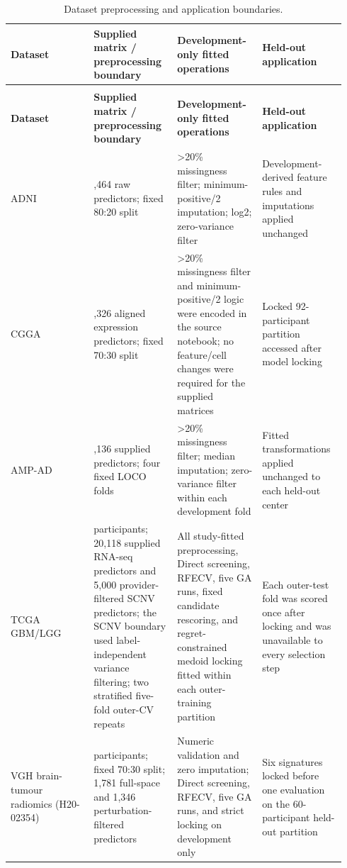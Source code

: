 {
\small
\renewcommand{\arraystretch}{1.08}
\setlength{\tabcolsep}{2.2pt}
\begin{longtable}{@{}>{\raggedright\arraybackslash}p{0.2350\linewidth}>{\centering\arraybackslash}p{0.2350\linewidth}>{\centering\arraybackslash}p{0.2350\linewidth}>{\raggedright\arraybackslash}p{0.2350\linewidth}@{}}
\caption{Dataset preprocessing and application boundaries.}\label{tab:supp26}\\
\toprule
\bfseries Dataset & \bfseries Supplied matrix / preprocessing boundary & \bfseries Development-only fitted operations & \bfseries Held-out application \\
\midrule
\endfirsthead
\multicolumn{4}{l}{\footnotesize\itshape \tablename~\thetable\ (continued)}\\
\toprule
\bfseries Dataset & \bfseries Supplied matrix / preprocessing boundary & \bfseries Development-only fitted operations & \bfseries Held-out application \\
\midrule
\endhead
\bottomrule
\endfoot
ADNI & 7,464 raw predictors; fixed 80:20 split & >20\% missingness filter; minimum-positive/2 imputation; log2; zero-variance filter & Development-derived feature rules and imputations applied unchanged \\
CGGA & 24,326 aligned expression predictors; fixed 70:30 split & >20\% missingness filter and minimum-positive/2 logic were encoded in the source notebook; no feature/cell changes were required for the supplied matrices & Locked 92-participant partition accessed after model locking \\
AMP-AD & 13,136 supplied predictors; four fixed LOCO folds & >20\% missingness filter; median imputation; zero-variance filter within each development fold & Fitted transformations applied unchanged to each held-out center \\
TCGA GBM/LGG & 491 participants; 20,118 supplied RNA-seq predictors and 5,000 provider-filtered SCNV predictors; the SCNV boundary used label-independent variance filtering; two stratified five-fold outer-CV repeats & All study-fitted preprocessing, Direct screening, RFECV, five GA runs, fixed candidate rescoring, and regret-constrained medoid locking fitted within each outer-training partition & Each outer-test fold was scored once after locking and was unavailable to every selection step \\
VGH brain-tumour radiomics (H20-02354) & 197 participants; fixed 70:30 split; 1,781 full-space and 1,346 perturbation-filtered predictors & Numeric validation and zero imputation; Direct screening, RFECV, five GA runs, and strict locking on development only & Six signatures locked before one evaluation on the 60-participant held-out partition \\
\end{longtable}
}

